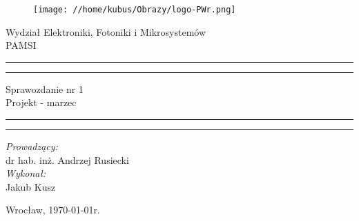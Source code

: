 \begin{titlepage}
\begin{figure}
	\centering
	\texttt{[image: //home/kubus/Obrazy/logo-PWr.png]}
	
	\label{fig:pwr}
\end{figure}
	\begin{center}
		\huge Wydział Elektroniki, Fotoniki i Mikrosystemów \\ 
		\vspace{40pt}
		\huge PAMSI  \\
	\end{center}
	\vspace{60pt}
	\hrule
	\vspace{1pt}
	\hrule
	\begin{center}
		{\fontsize{40}{50}\selectfont Sprawozdanie nr 1\\ }
		\vspace{10pt}
		{\fontsize{25}{25}\selectfont Projekt - marzec  }
	\end{center}
	\hrule
	\vspace{1pt}
	\hrule
	\begin{flushright}
		\vspace{65pt}
		\textit{\Large Prowadzący:}\\
		
		\Large dr hab. inż. Andrzej Rusiecki\\
		\vspace{10pt}
		\textit{\Large Wykonał:}\\
		
		\Large Jakub Kusz \\
	
	\end{flushright}
	\vspace{100pt}
	\begin{center}
		\large Wrocław, \today r.
	\end{center}
\end{titlepage}


